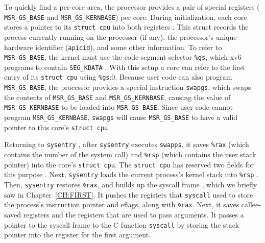 {To quickly find a per-core area, the processor provides a pair of
special registers (
\lstinline{MSR_GS_BASE}
and
\lstinline{MSR_GS_KERNBASE})
per core.
During initialization,
each core stores a pointer to its
\lstinline{struct cpu}
into both registers
.
This struct
records
the process currently running
on the processor (if any),
the processor's unique hardware identifier
(\lstinline{apicid}),
and some other information.
To refer to
\lstinline{MSR_GS_BASE},
the kernel must use the code segment selector
\texttt{\%gs},
which xv6 programs to contain
\lstinline{SEG_KDATA}
.
With this setup a core can refer to
the first entry of its
\lstinline{struct cpu}
using
\lstinline{%gs}:0.
Because user code can also program
\lstinline{MSR_GS_BASE},
the processor provides a special instruction
\lstinline{swapgs},
which swaps the contents of
\lstinline{MSR_GS_BASE}
and
\lstinline{MSR_GS_KERNBASE},
causing the value of
\lstinline{MSR_GS_KERNBASE}
to be loaded into
\lstinline{MSR_GS_BASE}.
Since user code cannot program
\lstinline{MSR_GS_KERNBASE},
\lstinline{swapgs}
will cause
\lstinline{MSR_GS_BASE}
to have a valid pointer to this core's
\lstinline{struct cpu}.

Returning to
\lstinline{sysentry}
,
after 
\lstinline{sysentry}
executes
\lstinline{swapps},
it saves
\texttt{\%rax}
(which contains the number of the system call)
and
\texttt{\%rsp}
(which contains the user stack pointer)
into the core's
\lstinline{struct cpu}.
The
\lstinline{struct cpu}
has reserved two fields for this purpose
.
Next,
\lstinline{sysentry}
loads the current process's kernel stack
into
\texttt{\%rsp}
.
Then,
\lstinline{sysentry}
restores
\texttt{\%rax},
and builds up the syscall frame
,
which we briefly saw in Chapter~\ref{CH:FIRST}. It pushes
the registers that
\lstinline{syscall}
used to store the process's instruction pointer and eflags,
along with
\texttt{\%rax}.
Next, it saves callee-saved registers and the registers
that are used to pass arguments.  It passes a pointer
to the syscall frame to the C function
\lstinline{syscall}
by storing the stack pointer into the register
for the first argument.

}
